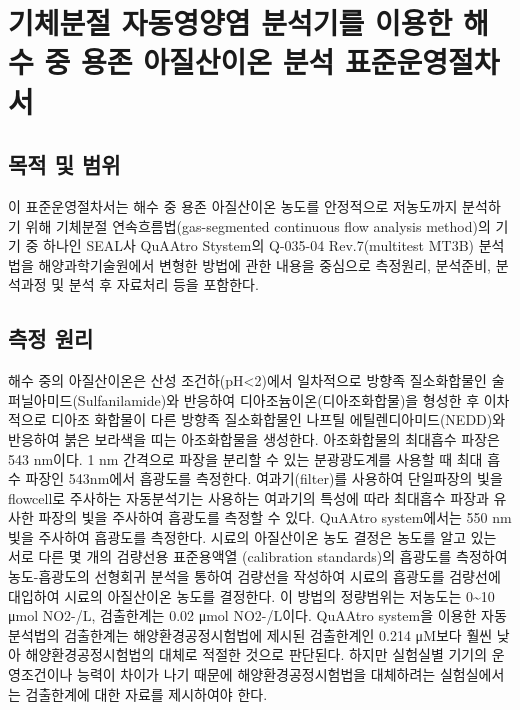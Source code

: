 \documentclass[
]{book}
\begin{document}
\hypertarget{uxae30uxccb4uxbd84uxc808-uxc790uxb3d9uxc601uxc591uxc5fc-uxbd84uxc11duxae30uxb97c-uxc774uxc6a9uxd55c-uxd574uxc218-uxc911-uxc6a9uxc874-uxc544uxc9c8uxc0b0uxc774uxc628-uxbd84uxc11d-uxd45cuxc900uxc6b4uxc601uxc808uxcc28uxc11c}{%
\chapter{기체분절 자동영양염 분석기를 이용한 해수 중 용존 아질산이온 분석 표준운영절차서}\label{uxae30uxccb4uxbd84uxc808-uxc790uxb3d9uxc601uxc591uxc5fc-uxbd84uxc11duxae30uxb97c-uxc774uxc6a9uxd55c-uxd574uxc218-uxc911-uxc6a9uxc874-uxc544uxc9c8uxc0b0uxc774uxc628-uxbd84uxc11d-uxd45cuxc900uxc6b4uxc601uxc808uxcc28uxc11c}}

\hypertarget{uxbaa9uxc801-uxbc0f-uxbc94uxc704}{%
\section{목적 및 범위}\label{uxbaa9uxc801-uxbc0f-uxbc94uxc704}}

이 표준운영절차서는 해수 중 용존 아질산이온 농도를 안정적으로 저농도까지 분석하기 위해 기체분절 연속흐름법(gas-segmented continuous flow analysis method)의 기기 중 하나인 SEAL사 QuAAtro Stystem의 Q-035-04 Rev.7(multitest MT3B) 분석법을 해양과학기술원에서 변형한 방법에 관한 내용을 중심으로 측정원리, 분석준비, 분석과정 및 분석 후 자료처리 등을 포함한다.

\hypertarget{uxce21uxc815-uxc6d0uxb9ac}{%
\section{측정 원리}\label{uxce21uxc815-uxc6d0uxb9ac}}

해수 중의 아질산이온은 산성 조건하(pH\textless2)에서 일차적으로 방향족 질소화합물인 술퍼닐아미드(Sulfanilamide)와 반응하여 디아조늄이온(디아조화합물)을 형성한 후 이차적으로 디아조 화합물이 다른 방향족 질소화합물인 나프틸 에틸렌디아미드(NEDD)와 반응하여 붉은 보라색을 띠는 아조화합물을 생성한다. 아조화합물의 최대흡수 파장은 543 nm이다.
1 nm 간격으로 파장을 분리할 수 있는 분광광도계를 사용할 때 최대 흡수 파장인 543nm에서 흡광도를 측정한다. 여과기(filter)를 사용하여 단일파장의 빛을 flowcell로 주사하는 자동분석기는 사용하는 여과기의 특성에 따라 최대흡수 파장과 유사한 파장의 빛을 주사하여 흡광도를 측정할 수 있다. QuAAtro system에서는 550 nm 빛을 주사하여 흡광도를 측정한다.
시료의 아질산이온 농도 결정은 농도를 알고 있는 서로 다른 몇 개의 검량선용 표준용액열 (calibration standards)의 흡광도를 측정하여 농도-흡광도의 선형회귀 분석을 통하여 검량선을 작성하여 시료의 흡광도를 검량선에 대입하여 시료의 아질산이온 농도를 결정한다.
이 방법의 정량범위는 저농도는 0\textasciitilde10 μmol NO2-/L, 검출한계는 0.02 μmol NO2-/L이다. QuAAtro system을 이용한 자동분석법의 검출한계는 해양환경공정시험법에 제시된 검출한계인 0.214 μM보다 훨씬 낮아 해양환경공정시험법의 대체로 적절한 것으로 판단된다. 하지만 실험실별 기기의 운영조건이나 능력이 차이가 나기 때문에 해양환경공정시험법을 대체하려는 실험실에서는 검출한계에 대한 자료를 제시하여야 한다.
\end{document}

